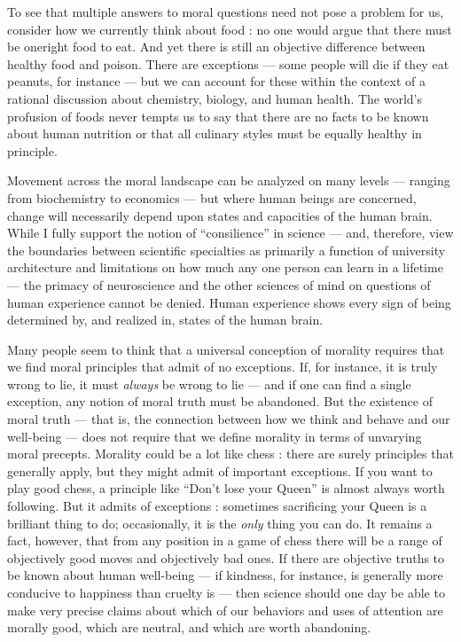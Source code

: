 \documentclass[a4paper,12pt]{extbook}
\begin{document}
To see that multiple answers to moral questions need not pose a problem for us, consider how we currently think about food :
no one would argue that there must be oneright food to eat. 
And yet there is still an objective difference between healthy food and poison. 
There are exceptions --- some people will die if they eat peanuts, for instance --- but we can account for these within the context of a rational discussion about chemistry, biology, and human health. 
The world’s profusion of foods never tempts us to say that there are no facts to be known about human nutrition or that all culinary styles must be equally healthy in principle. 

Movement across the moral landscape can be analyzed on many levels --- ranging from biochemistry to economics --- but where human beings are concerned, change will necessarily depend upon states and capacities of the human brain. 
While I fully support the notion of ``consilience'' in science --- and, therefore, view the boundaries between scientific specialties as primarily a function of university architecture and limitations on how much any one person can learn in a lifetime --- the primacy of neuroscience and the other sciences of mind on questions of human experience cannot be denied. 
Human experience shows every sign of being determined by, and realized in, states of the human brain. 

Many people seem to think that a universal conception of morality requires that we find moral principles that admit of no exceptions. 
If, for instance, it is truly wrong to lie, it must \textit{always} be wrong to lie --- and if one can find a single exception, any notion of moral truth must be abandoned. 
But the existence of moral truth --- that is, the connection between how we think and behave and our well-being --- does not require that we define morality in terms of unvarying moral precepts. 
Morality could be a lot like chess :
there are surely principles that generally apply, but they might admit of important exceptions. 
If you want to play good chess, a principle like ``Don’t lose your Queen'' is almost always worth following. 
But it admits of exceptions :
sometimes sacrificing your Queen is a brilliant thing to do;
occasionally, it is the \textit{only} thing you can do. 
It remains a fact, however, that from any position in a game of chess there will be a range of objectively good moves and objectively bad ones. 
If there are objective truths to be known about human well-being --- if kindness, for instance, is generally more conducive to happiness than cruelty is --- then science should one day be able to make very precise claims about which of our behaviors and uses of attention are morally good, which are neutral, and which are worth abandoning. 
\end{document}
